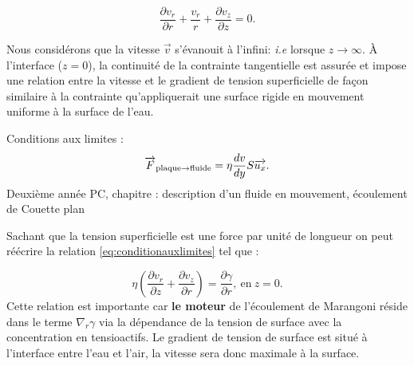 \documentclass[french, 10pt]{article}
\begin{document}
\begin{equation}
  \frac{\partial v_r}{\partial r}+\frac{v_r}{r}+\frac{\partial v_z}{\partial z}=0.
\end{equation}

Nous considérons que la vitesse $\vec{v}$ s'évanouit à l'infini: \textit{i.e }lorsque $z\rightarrow \infty$. À l'interface ($z=0$), la continuité de la contrainte tangentielle est assurée et impose une relation entre la vitesse et le gradient de tension superficielle de façon similaire à la contrainte qu'appliquerait une surface rigide en mouvement uniforme à la surface de l'eau.  

\begin{Programme}{Conditions aux limites :}
  \begin{equation}
   \vec{F}_{\rm plaque\rightarrow fluide} = \eta\dfrac{d v}{dy}S\vec{u_x}.\label{eq:conditionauxlimites}
  \end{equation}
  Deuxième année PC, chapitre : description d'un fluide en mouvement, écoulement de Couette plan
\end{Programme}

Sachant que la tension superficielle est une force par unité de longueur on peut réécrire la relation \eqref{eq:conditionauxlimites} tel que :

\begin{equation}
  \eta\left(\frac{\partial v_r}{\partial z}+\frac{\partial v_z}{\partial r}\right) = \frac{\partial \gamma}{\partial r}, ~\text{en}~z=0.\label{eq:CL}
\end{equation}
Cette relation est importante car  \textbf{le moteur} de l'écoulement de Marangoni réside dans le terme $\nabla_r\gamma$ via la dépendance de la tension de surface avec la concentration en tensioactifs. Le gradient de tension de surface est situé à l'interface entre l'eau et l'air, la vitesse sera donc maximale à la surface.\medskip%

\end{document}
